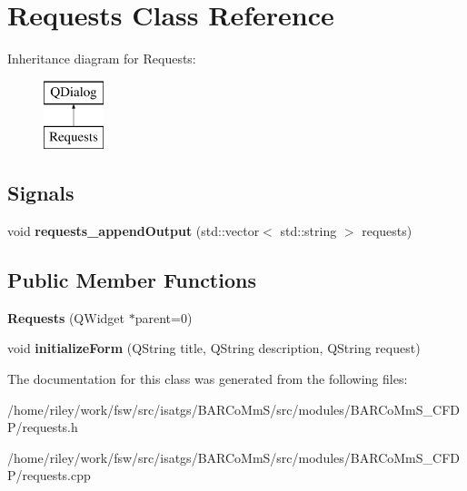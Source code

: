 \hypertarget{class_requests}{}\section{Requests Class Reference}
\label{class_requests}
Inheritance diagram for Requests\+:\begin{figure}[H]
\begin{center}
\leavevmode
\includegraphics[height=2.000000cm]{class_requests}
\end{center}
\end{figure}
\subsection*{Signals}
\begin{DoxyCompactItemize}
\item 
void {\bfseries requests\+\_\+append\+Output} (std\+::vector$<$ std\+::string $>$ requests)\hypertarget{class_requests_a3221858d3e1462d504bb1f64d84701c0}{}\label{class_requests_a3221858d3e1462d504bb1f64d84701c0}

\end{DoxyCompactItemize}
\subsection*{Public Member Functions}
\begin{DoxyCompactItemize}
\item 
{\bfseries Requests} (Q\+Widget $\ast$parent=0)\hypertarget{class_requests_a26026f2733a6fca27d1f3d85d2a92602}{}\label{class_requests_a26026f2733a6fca27d1f3d85d2a92602}

\item 
void {\bfseries initialize\+Form} (Q\+String title, Q\+String description, Q\+String request)\hypertarget{class_requests_a7e5fcc23aab5ddfe778d4fb008d427a4}{}\label{class_requests_a7e5fcc23aab5ddfe778d4fb008d427a4}

\end{DoxyCompactItemize}


The documentation for this class was generated from the following files\+:\begin{DoxyCompactItemize}
\item 
/home/riley/work/fsw/src/isatgs/\+B\+A\+R\+Co\+Mm\+S/src/modules/\+B\+A\+R\+Co\+Mm\+S\+\_\+\+C\+F\+D\+P/requests.\+h\item 
/home/riley/work/fsw/src/isatgs/\+B\+A\+R\+Co\+Mm\+S/src/modules/\+B\+A\+R\+Co\+Mm\+S\+\_\+\+C\+F\+D\+P/requests.\+cpp\end{DoxyCompactItemize}

